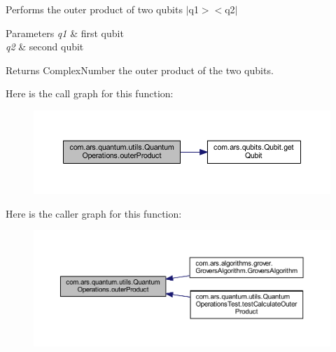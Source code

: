 Performs the outer product of two qubits $\vert$q1$>$$<$q2$\vert$


\begin{DoxyParams}{Parameters}
{\em q1} & first qubit \\
\hline
{\em q2} & second qubit \\
\hline
\end{DoxyParams}
\begin{DoxyReturn}{Returns}
Complex\+Number the outer product of the two qubits. 
\end{DoxyReturn}
Here is the call graph for this function\+:
\nopagebreak
\begin{figure}[H]
\begin{center}
\leavevmode
\includegraphics[width=350pt]{classcom_1_1ars_1_1quantum_1_1utils_1_1_quantum_operations_a52a3eb03179e67e2a786cd724ff135bf_cgraph}
\end{center}
\end{figure}
Here is the caller graph for this function\+:
\nopagebreak
\begin{figure}[H]
\begin{center}
\leavevmode
\includegraphics[width=350pt]{classcom_1_1ars_1_1quantum_1_1utils_1_1_quantum_operations_a52a3eb03179e67e2a786cd724ff135bf_icgraph}
\end{center}
\end{figure}
\hypertarget{classcom_1_1ars_1_1quantum_1_1utils_1_1_quantum_operations_a6d799274602f9c86fe28930b67ff5853}{}\label{classcom_1_1ars_1_1quantum_1_1utils_1_1_quantum_operations_a6d799274602f9c86fe28930b67ff5853} 

